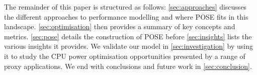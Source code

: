 The remainder of this paper is structured as follows: \autoref{sec:approaches} discusses the different approaches to performance modelling and where POSE fits in this landscape.
\autoref{sec:optimisation} then provides a summary of key concepts and metrics.
\autoref{sec:pose} details the construction of POSE before \autoref{sec:insights} lists the various insights it provides.
We validate our model in \autoref{sec:investigation} by using it to study the CPU power optimisation opportunities presented by a range of proxy applications. 
We end with conclusions and future work in \autoref{sec:conclusion}.
